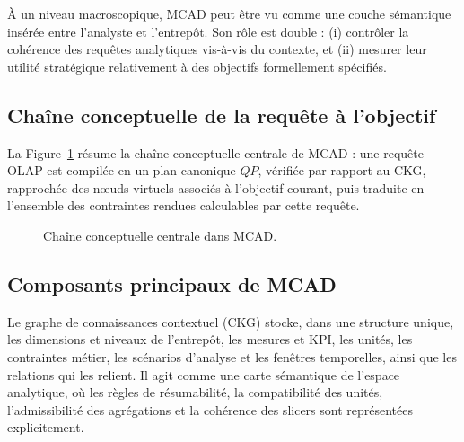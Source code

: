\documentclass[journal]{IEEEtran}
\begin{document}
À un niveau macroscopique, MCAD peut être vu comme une couche sémantique insérée entre l'analyste et l'entrepôt. Son rôle est double : (i) contrôler la cohérence des requêtes analytiques vis-à-vis du contexte, et (ii) mesurer leur utilité stratégique relativement à des objectifs formellement spécifiés.

\subsection{Chaîne conceptuelle de la requête à l'objectif}

La Figure~\ref{fig:concept-chain} résume la chaîne conceptuelle centrale de MCAD : une requête OLAP est compilée en un plan canonique $QP$, vérifiée par rapport au CKG, rapprochée des nœuds virtuels associés à l'objectif courant, puis traduite en l'ensemble des contraintes rendues calculables par cette requête.

\begin{figure}[!t]
\centering
{}
\caption{Chaîne conceptuelle centrale dans MCAD.}
\label{fig:concept-chain}
\end{figure}

\subsection{Composants principaux de MCAD}

Le graphe de connaissances contextuel (CKG) stocke, dans une structure unique, les dimensions et niveaux de l'entrepôt, les mesures et KPI, les unités, les contraintes métier, les scénarios d'analyse et les fenêtres temporelles, ainsi que les relations qui les relient. Il agit comme une carte sémantique de l'espace analytique, où les règles de résumabilité, la compatibilité des unités, l'admissibilité des agrégations et la cohérence des slicers sont représentées explicitement.
\end{document}
